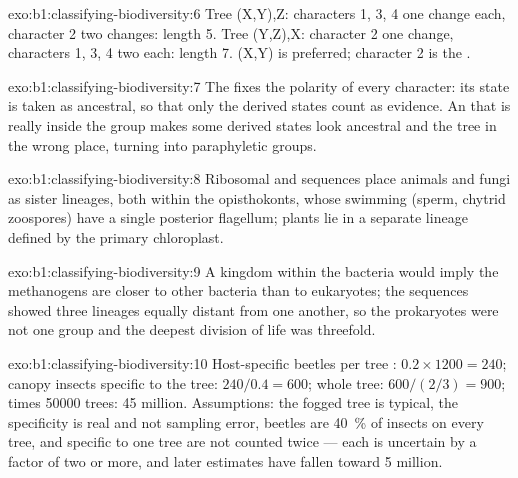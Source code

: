 \begin{solution}{exo:b1:classifying-biodiversity:6}
Tree (X,Y),Z: characters 1, 3, 4 one change each, character 2 two
changes: length 5. Tree (Y,Z),X: character 2 one change, characters
1, 3, 4 two each: length 7. (X,Y) is preferred; character 2 is the
.
\end{solution}

\begin{solution}{exo:b1:classifying-biodiversity:7}
The  fixes the polarity of every character: its state is
taken as ancestral, so that only the derived states count as
evidence. An  that is really inside the group makes some
derived states look ancestral and  the tree in the wrong place,
turning  into paraphyletic groups.
\end{solution}

\begin{solution}{exo:b1:classifying-biodiversity:8}
Ribosomal and  sequences place animals and fungi as sister
lineages, both within the opisthokonts, whose swimming 
(sperm, chytrid zoospores) have a single posterior flagellum; plants
lie in a separate lineage defined by the primary chloroplast.
\end{solution}

\begin{solution}{exo:b1:classifying-biodiversity:9}
A kingdom within the bacteria would imply the methanogens are closer
to other bacteria than to eukaryotes; the sequences showed three
lineages equally distant from one another, so the prokaryotes were
not one group and the deepest division of life was threefold.
\end{solution}

\begin{solution}{exo:b1:classifying-biodiversity:10}
Host-specific beetles per tree : $0.2\times 1200 = 240$;
canopy insects specific to the tree: $240/0.4 = 600$; whole tree:
$600/(2/3) = 900$; times \num{50000} trees: \num{45} million.
Assumptions: the fogged tree is typical, the specificity is real
and not sampling error, beetles are \qty{40}{\%} of insects on every
tree, and  specific to one tree are not counted twice ---
each is uncertain by a factor of two or more, and later estimates
have fallen toward \num{5} million.
\end{solution}

